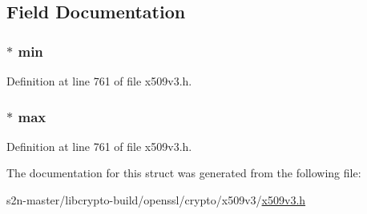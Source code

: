 \subsection{Field Documentation}
\subsubsection[{\texorpdfstring{min}{min}}]{ $\ast$ min}\hypertarget{struct_a_s_range__st_adc933969ce371cc29e36e1967b27800a}{}\label{struct_a_s_range__st_adc933969ce371cc29e36e1967b27800a}


Definition at line 761 of file x509v3.\+h.

\subsubsection[{\texorpdfstring{max}{max}}]{ $\ast$ max}\hypertarget{struct_a_s_range__st_abf4b6674b59fb0fda91d1a2041673b4b}{}\label{struct_a_s_range__st_abf4b6674b59fb0fda91d1a2041673b4b}


Definition at line 761 of file x509v3.\+h.



The documentation for this struct was generated from the following file\+:\begin{DoxyCompactItemize}
\item 
s2n-\/master/libcrypto-\/build/openssl/crypto/x509v3/\hyperlink{crypto_2x509v3_2x509v3_8h}{x509v3.\+h}\end{DoxyCompactItemize}

